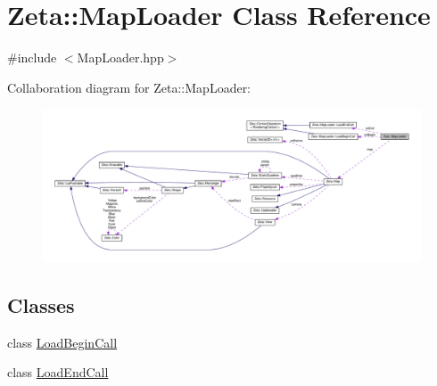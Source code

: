 \hypertarget{classZeta_1_1MapLoader}{\section{Zeta\+:\+:Map\+Loader Class Reference}
\label{classZeta_1_1MapLoader}
}


{\ttfamily \#include $<$Map\+Loader.\+hpp$>$}



Collaboration diagram for Zeta\+:\+:Map\+Loader\+:\nopagebreak
\begin{figure}[H]
\begin{center}
\leavevmode
\includegraphics[width=350pt]{classZeta_1_1MapLoader__coll__graph}
\end{center}
\end{figure}
\subsection*{Classes}
\begin{DoxyCompactItemize}
\item 
class \hyperlink{classZeta_1_1MapLoader_1_1LoadBeginCall}{Load\+Begin\+Call}
\item 
class \hyperlink{classZeta_1_1MapLoader_1_1LoadEndCall}{Load\+End\+Call}
\end{DoxyCompactItemize}
